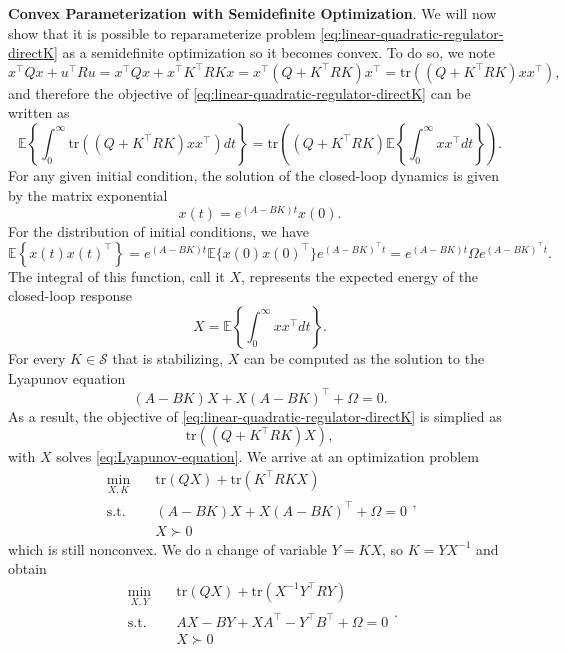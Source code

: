 \documentclass[
]{book}
\theoremstyle{definition}
\theoremstyle{definition}
\theoremstyle{definition}
\theoremstyle{definition}
\theoremstyle{remark}
\begin{document}
\textbf{Convex Parameterization with Semidefinite Optimization}. We will now show that it is possible to reparameterize problem \eqref{eq:linear-quadratic-regulator-directK} as a semidefinite optimization so it becomes convex. To do so, we note
\[
x^\top Q x + u^\top R u = x^\top Q x + x^\top K^\top R K x = x^\top(Q + K^\top R K)x^\top= \mathrm{tr}((Q + K^\top R K)xx^\top),
\]
and therefore the objective of \eqref{eq:linear-quadratic-regulator-directK} can be written as
\begin{equation}
\mathbb{E} \left\{ \int_{0}^{\infty} \mathrm{tr}((Q + K^\top R K) xx^\top) dt  \right\}  = \mathrm{tr}\left( (Q + K^\top R K) \mathbb{E} \left\{  \int_{0}^{\infty} xx^\top dt  \right\}    \right).
\end{equation}
For any given initial condition, the solution of the closed-loop dynamics is given by the matrix exponential
\[
x(t) = e^{(A-BK)t} x(0).
\]
For the distribution of initial conditions, we have
\[
\mathbb{E} \left\{ x(t)x(t)^\top \right\}  = e^{(A-BK)t} \mathbb{E}\{ x(0)x(0)^\top \}  e^{(A-BK)^\top t} = e^{(A-BK)t} \Omega  e^{(A-BK)^\top t}.
\]
The integral of this function, call it \(X\), represents the expected energy of the closed-loop response
\[
X = \mathbb{E} \left\{ \int_{0}^{\infty} xx^\top dt \right\} .
\]
For every \(K \in \mathcal{S}\) that is stabilizing, \(X\) can be computed as the solution to the Lyapunov equation
\begin{equation}
(A - BK) X + X(A - BK)^\top+ \Omega = 0.
\label{eq:Lyapunov-equation}
\end{equation}
As a result, the objective of \eqref{eq:linear-quadratic-regulator-directK} is simplied as
\[
\mathrm{tr}((Q + K^\top R K) X),
\]
with \(X\) solves \eqref{eq:Lyapunov-equation}. We arrive at an optimization problem
\begin{equation}
\begin{split}
\min_{X,K} & \quad \mathrm{tr}(QX) + \mathrm{tr}(K^\top R K X) \\
\mathrm{s.t.}& \quad (A-BK) X + X (A - BK)^\top+ \Omega = 0 \\
& \quad X \succ 0
\end{split},
\label{eq:lqr-directK-toX}
\end{equation}
which is still nonconvex. We do a change of variable \(Y = KX\), so \(K = Y X ^{-1}\) and obtain
\begin{equation}
\begin{split}
\min_{X,Y} & \quad \mathrm{tr}(QX) + \mathrm{tr}(X^{-1}Y^\top R Y) \\
\mathrm{s.t.}& \quad AX - BY + XA^\top- Y^\top B^\top+ \Omega = 0 \\
& \quad X \succ 0
\end{split}.
\label{eq:lqr-directK-toX-1}
\end{equation}
\end{document}
